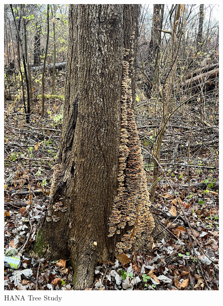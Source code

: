 \documentclass{article}
\begin{document}
\begin{figure}[h!]
\centering
\includegraphics[scale=.1]{Research/HANA/NOV2024/IMG_9859.JPG}
\caption{HANA Tree Study}
\label{fig:HANA}
\end{figure}
\end{document}

